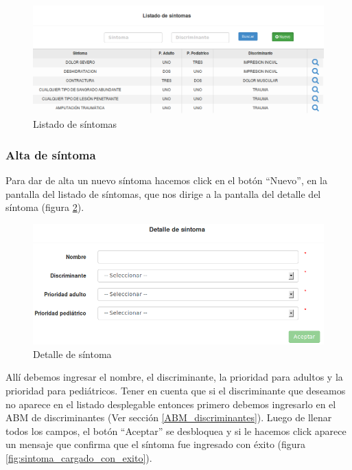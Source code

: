 \begin{figure}
\centerline{\includegraphics[width=1\textwidth]{listado_sintomas.png}}
\caption{Listado de síntomas}
\label{fig:listado_sintomas}
\end{figure}

\subsubsection{Alta de síntoma}
Para dar de alta un nuevo síntoma hacemos click en el botón ``Nuevo'', en la pantalla del listado de síntomas, que nos dirige a la pantalla del detalle del síntoma (figura \ref{fig:detalle_sintoma}).
\begin{figure}
\centerline{\includegraphics[width=1\textwidth]{detalle_sintoma.png}}
\caption{Detalle de síntoma}
\label{fig:detalle_sintoma}
\end{figure}
Allí debemos ingresar el nombre, el discriminante, la prioridad para adultos y la prioridad para pediátricos. Tener en cuenta que si el discriminante que deseamos no aparece en el listado desplegable entonces primero debemos ingresarlo en el ABM de discriminantes (Ver sección \ref{ABM_discriminantes}). Luego de llenar todos los campos, el botón ``Aceptar'' se desbloquea y si le hacemos click aparece un mensaje que confirma que el síntoma fue ingresado con éxito (figura \ref{fig:sintoma_cargado_con_exito}).
